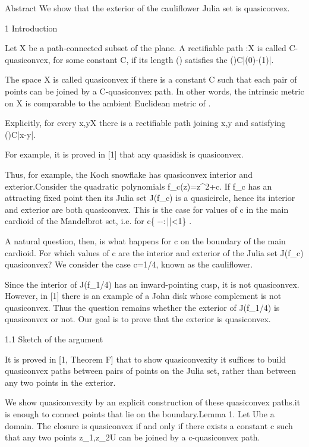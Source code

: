 \documentclass[12pt]{article}
\numberwithin{equation}{section}
\theoremstyle{remark}
\theoremstyle{definition}
\begin{document}
Abstract We show that the exterior of the cauliflower Julia set is quasiconvex.

1 Introduction

Let X be a path-connected subset of the plane. A rectifiable path \gamma:\left[0,1\right]\to X is called C-quasiconvex, for some constant C, if its length \ell\left(\gamma\right) satisfies the \ell(\gamma)\leq C\cdot\left|\gamma(0)-\gamma(1)\right|.

The space X is called quasiconvex if there is a constant C such that each pair of points can be joined by a C-quasiconvex path. In other words, the intrinsic metric on X is comparable to the ambient Euclidean metric of \C.

Explicitly, for every x,y\in X there is a rectifiable path \gamma joining x,y and satisfying \ell(\gamma)\leq C\left|x-y\right|.

For example, it is proved in [1] that any quasidisk is quasiconvex. 

Thus, for example, the Koch snowflake has quasiconvex interior and exterior.Consider the quadratic polynomials f_{c}(z)=z^{2}+c. If f_{c} has an attracting fixed point then its Julia set J(f_{c}) is a quasicircle, hence its interior and exterior are both quasiconvex. This is the case for values of c in the main cardioid of the Mandelbrot set, i.e. for c\in\left\{ --:\,\left|\lambda\right|<1\right\} .

A natural question, then, is what happens for c on the boundary of the main cardioid. For which values of c are the interior and exterior of the Julia set J(f_{c}) quasiconvex? We consider the case c=1/4, known as the cauliflower.

Since the interior of J(f_{1/4}) has an inward-pointing cusp, it is not quasiconvex. However, in [1] there is an example of a John disk whose complement is not quasiconvex. Thus the question remains whether the exterior of J(f_{1/4}) is quasiconvex or not. Our goal is to prove that the exterior is quasiconvex. 

1.1 Sketch of the argument

It is proved in [1, Theorem F] that to show quasiconvexity it suffices to build quasiconvex paths between pairs of points on the Julia set, rather than between any two points in the exterior.

We show quasiconvexity by an explicit construction of these quasiconvex paths.it is enough to connect points that lie on the boundary.Lemma 1. Let U\subset\C be a domain. The closure  is quasiconvex if and only if there exists a constant c such that any two points z_{1},z_{2}\in\partial U can be joined by a c-quasiconvex path.
\end{document}

